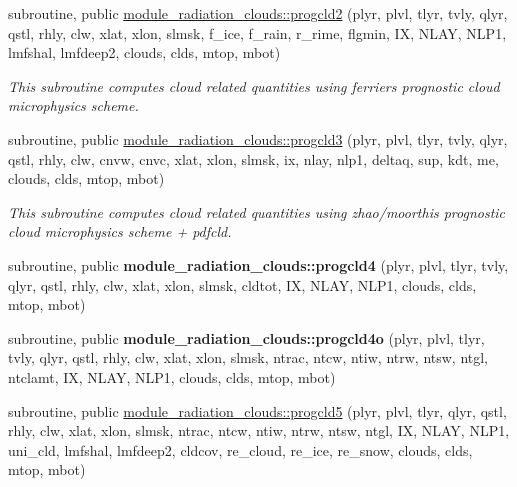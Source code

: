 \begin{DoxyCompactItemize}
\item 
subroutine, public \hyperlink{group__module__radiation__clouds_ga3fd7643ce526761b17d04eec6a332333}{module\+\_\+radiation\+\_\+clouds\+::progcld2} (plyr, plvl, tlyr, tvly, qlyr, qstl, rhly, clw, xlat, xlon, slmsk, f\+\_\+ice, f\+\_\+rain, r\+\_\+rime, flgmin, IX, N\+L\+AY, N\+L\+P1, lmfshal, lmfdeep2, clouds, clds, mtop, mbot)
\begin{DoxyCompactList}\small\item\em This subroutine computes cloud related quantities using ferrier\textquotesingle{}s prognostic cloud microphysics scheme. \end{DoxyCompactList}\end{DoxyCompactItemize}
\begin{DoxyCompactItemize}
\item 
subroutine, public \hyperlink{group__module__radiation__clouds_gaeab51a06b22516fbfc78ab2c9eaf2622}{module\+\_\+radiation\+\_\+clouds\+::progcld3} (plyr, plvl, tlyr, tvly, qlyr, qstl, rhly, clw, cnvw, cnvc, xlat, xlon, slmsk, ix, nlay, nlp1, deltaq, sup, kdt, me, clouds, clds, mtop, mbot)
\begin{DoxyCompactList}\small\item\em This subroutine computes cloud related quantities using zhao/moorthi\textquotesingle{}s prognostic cloud microphysics scheme + pdfcld. \end{DoxyCompactList}\item 
\mbox{\label{group__module__radiation__clouds_gabc94febdae92fa27984f169e713a8774}} 
subroutine, public {\bfseries module\+\_\+radiation\+\_\+clouds\+::progcld4} (plyr, plvl, tlyr, tvly, qlyr, qstl, rhly, clw, xlat, xlon, slmsk, cldtot, IX, N\+L\+AY, N\+L\+P1, clouds, clds, mtop, mbot)
\item 
\mbox{\label{group__module__radiation__clouds_gaa054de52f7568837d7a82ee1e2117b90}} 
subroutine, public {\bfseries module\+\_\+radiation\+\_\+clouds\+::progcld4o} (plyr, plvl, tlyr, tvly, qlyr, qstl, rhly, clw, xlat, xlon, slmsk, ntrac, ntcw, ntiw, ntrw, ntsw, ntgl, ntclamt, IX, N\+L\+AY, N\+L\+P1, clouds, clds, mtop, mbot)
\item 
subroutine, public \hyperlink{group__module__radiation__clouds_ga0c2a2c0d1abf49c1d6bbeb12d3223893}{module\+\_\+radiation\+\_\+clouds\+::progcld5} (plyr, plvl, tlyr, qlyr, qstl, rhly, clw, xlat, xlon, slmsk, ntrac, ntcw, ntiw, ntrw, ntsw, ntgl, IX, N\+L\+AY, N\+L\+P1, uni\+\_\+cld, lmfshal, lmfdeep2, cldcov, re\+\_\+cloud, re\+\_\+ice, re\+\_\+snow, clouds, clds, mtop, mbot)
\end{DoxyCompactItemize}
